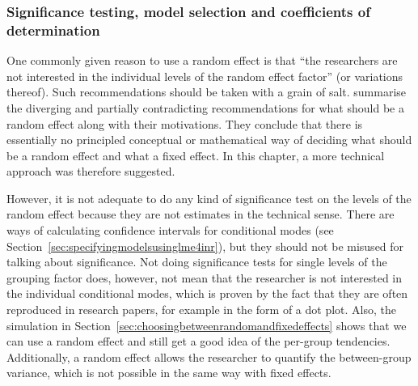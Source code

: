 \documentclass[a4paper,12pt]{article}
\begin{document}
\subsubsection{Significance testing, model selection and coefficients of determination}
\label{sec:significancetestingandcoefficientsofdetermination}

One commonly given reason to use a random effect is that ``the researchers are not interested in the individual levels of the random effect factor'' (or variations thereof).
Such recommendations should be taken with a grain of salt.
\citet[245--247]{GelmanHill2006} summarise the diverging and partially contradicting recommendations for what should be a random effect along with their motivations.
They conclude that there is essentially no principled conceptual or mathematical way of deciding what should be a random effect and what a fixed effect.
In this chapter, a more technical approach was therefore suggested.

However, it is not adequate to do any kind of significance test on the levels of the random effect because they are not estimates in the technical sense.
There are ways of calculating confidence intervals for conditional modes (see Section~\ref{sec:specifyingmodelsusinglme4inr}), but they should not be misused for talking about significance.
Not doing significance tests for single levels of the grouping factor does, however, not mean that the researcher is not interested in the individual conditional modes, which is proven by the fact that they are often reproduced in research papers, for example in the form of a dot plot.
Also, the simulation in Section~\ref{sec:choosingbetweenrandomandfixedeffects} shows that we can use a random effect and still get a good idea of the per-group tendencies.
Additionally, a random effect allows the researcher to quantify the between-group variance, which is not possible in the same way with fixed effects.
\end{document}
